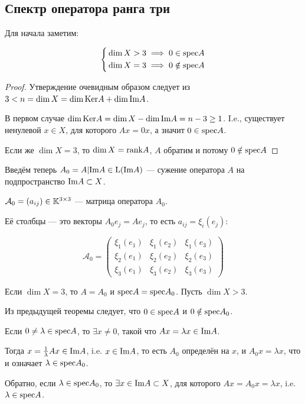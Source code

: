 \subsection{Спектр оператора ранга три}
Для начала заметим:
\begin{thm}
  $$\left\{\begin{aligned}
    & \dim X > 3 \implies 0\in \mathrm{spec} A \\
    & \dim X = 3 \implies 0\notin \mathrm{spec} A\end{aligned}\right.$$
\end{thm}
\begin{proof}
  Утверждение очевидным образом
  следует из $3 < n = \dim X = \dim\mathrm{Ker} A + \dim\mathrm{Im} A$.

  В первом случае $\dim\mathrm{Ker} A = \dim X - \dim\mathrm{Im} A = n - 3 \geq 1$.
  I.e., существует ненулевой  $x\in X$, для которого $A x = 0 x$, а значит $0\in\mathrm{spec} A$.

  Если же $\dim X = 3$, то $\dim X = \mathrm{rank} A$, $A$ обратим и потому $0\notin\mathrm{spec} A$
\end{proof}

Введём теперь $A_0 = A|\mathrm{Im} A \in \mathrm{L}(\mathrm{Im} A)$
--- сужение оператора $A$ на подпространство $\mathrm{Im} A\subset X$.

$\mathcal A_0 = \left(a_{ij}\right) \in \mathbb{K}^{3\times 3}$ --- матрица оператора $A_0$.

Её столбцы --- это векторы $A_0 e_j  = A e_j$, то есть $a_{ij} = \xi_i(e_j)$:

$$\mathcal A_0 =
\begin{pmatrix}
\xi_1(e_1) & \xi_1(e_2) & \xi_1(e_3) \\
\xi_2(e_1) & \xi_2(e_2) & \xi_2(e_3) \\
\xi_3(e_1) & \xi_3(e_2) & \xi_3(e_3)
\end{pmatrix}$$

Если $\dim X = 3$, то $A = A_0$ и $\mathrm{spec} A = \mathrm{spec} A_0$.
Пусть $\dim X > 3$.

Из предыдущей теоремы следует,
что $0\in\mathrm{spec} A$ и $0\notin\mathrm{spec} A_0$.

Если $0\neq\lambda\in\mathrm{spec} A$, то $\exists x\neq 0$,
такой что $A x = \lambda x \in \mathrm{Im} A$.

Тогда $x = \frac{1}{\lambda} A x\in\mathrm{Im} A$, i.e. $x\in \mathrm{Im} A$,
то есть $A_0$ определён на $x$,
и $A_0 x = \lambda x$, что и означает $\lambda\in\mathrm{spec} A_0$.

Обратно, если $\lambda\in\mathrm{spec} A_0$,
то $\exists x\in\mathrm{Im} A\subset X$,
для которого $A x = A_0 x = \lambda x$,
i.e. $\lambda\in\mathrm{spec} A$.


